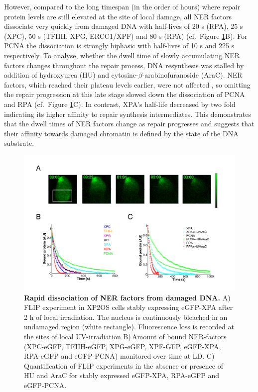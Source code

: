 However, compared to the long timespan (in the order of hours) where repair protein levels are still elevated at the site of local damage, all NER factors dissociate very quickly from damaged DNA with half-lives of 20 s (RPA), 25 s (XPC), 50 s (TFIIH, XPG, ERCC1/XPF) and 80 s (RPA) (cf.\ Figure \ref{fig:accuFlip}B). For PCNA the dissociation is strongly biphasic with half-lives of 10 s and 225 s respectively. To analyse, whether the dwell time of slowly accumulating NER factors changes throughout the repair process, DNA resynthesis was stalled by addition of hydroxyurea (HU) and cytosine-$\beta$-arabinofuranoside (AraC). NER factors, which reached their plateau levels earlier, were not affected \cite{Luijsterburg2010}, so omitting the repair progression at this late stage slowed down the dissociation of PCNA and RPA (cf.\ Figure \ref{fig:accuFlip}C). In contrast, XPA's half-life decreased by two fold indicating its higher affinity to repair synthesis intermediates. This demonstrates that the dwell times of NER factors change as repair progresses and suggests that their affinity towards damaged chromatin is defined by the state of the DNA substrate.      
           
  \begin{figure}[htbp]
  	\begin{center}
  		\includegraphics[width=1\textwidth]{Abbildungen/figure2_2_2.pdf}
  		\caption{\textbf{Rapid dissociation of NER factors from damaged DNA.} A) FLIP experiment in XP2OS cells stably expressing eGFP-XPA after 2 h of local irradiation. The nucleus is continuously bleached in an undamaged region (white rectangle). Fluorescence loss is recorded at the sites of local UV-irradiation B)\,Amount of bound NER-factors (XPC-eGFP, TFIIH-eGFP, XPG-eGFP, XPF-GFP, eGFP-XPA, RPA-eGFP and eGFP-PCNA) monitored over time at LD. C) Quantification of FLIP experiments in the absence or presence of HU and AraC for stably expressed eGFP-XPA, RPA-eGFP and eGFP-PCNA.}
  		\label{fig:accuFlip}
  	\end{center}
  \end{figure}




